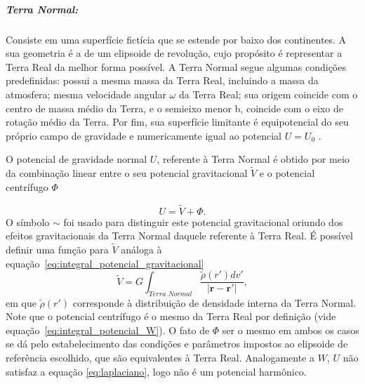 
\subparagraph{\textit{Terra Normal}:}  Consiste em uma superfície fictícia que se estende por baixo dos continentes. A sua geometria é a de um elipsoide de revolução, cujo propósito é representar a Terra Real da melhor forma possível. A Terra Normal segue algumas condições predefinidas: possui a mesma massa da Terra Real, incluindo a massa da atmosfera; mesma velocidade angular $\omega$ da Terra Real; sua origem coincide com o centro de massa médio da Terra, e o semieixo menor b, coincide com o eixo de rotação médio da Terra. Por fim, sua superfície limitante é equipotencial do seu próprio campo de gravidade \cite{heiskanen1967, hofmann2005} e numericamente igual ao potencial $U=U_0$ \cite{escobar2000}.

O potencial de gravidade normal $U$, referente à Terra Normal é obtido por meio da combinação linear entre o seu potencial gravitacional $\tilde{V}$ e o potencial centrífugo $\Phi$

\begin{equation} \label{eq:esferopotencial}
\displaystyle {U = \tilde{V} + \Phi}.
\end{equation}
O símbolo $\mathbf{\sim}$ foi usado para distinguir este potencial gravitacional oriundo dos efeitos gravitacionais da Terra Normal daquele referente à Terra Real. É possível definir uma função para $\tilde{V} $ análoga à equação~\ref{eq:integral_potencial_gravitacional}
\begin{equation} \label{eq:integral_potencial_gravitacional_normal}
\displaystyle {\tilde{V} = G \int_{Terra\,\,Normal} \frac{\tilde{\rho}(r') dv'}{| \mathbf{r} - \mathbf{r'} |},} 
\end{equation}
em que $\tilde{\rho}(r')$ corresponde à distribuição de densidade interna da Terra Normal. Note que o potencial centrífugo é o mesmo da Terra Real por definição \cite{heiskanen1967} (vide equação~\ref{eq:integral_potencial_W}). O fato de $\Phi$ ser o mesmo em ambos os casos se dá pelo estabelecimento das condições e parâmetros impostos ao elipsoide de referência escolhido, que são equivalentes à Terra Real. Analogamente a $W$, $U$ não satisfaz a equação \ref{eq:laplaciano}, logo não é um potencial harmônico.

